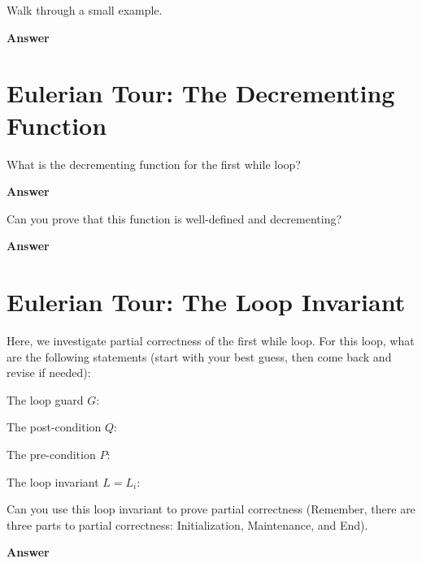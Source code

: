 \documentclass{article}
\begin{document}
\pagebreak

Walk through a small example.

\textbf{Answer}

\pagebreak
\section*{Eulerian Tour: The Decrementing Function}

What is the decrementing function for the first while loop?

\textbf{Answer}
\vspace{1in}


Can you prove that this function is well-defined and decrementing?

\textbf{Answer}
\vspace{1in}


\pagebreak
\section*{Eulerian Tour: The Loop Invariant}

Here, we investigate partial correctness of the first while loop.  For this loop, what
are the following statements (start with your best guess, then come back and
revise if needed):

The loop guard $G$:
\vspace{0.5in}

The post-condition $Q$:
\vspace{0.5in}

The pre-condition $P$:
\vspace{0.5in}

The loop invariant $L=L_i$:
\vspace{0.5in}


Can you use this loop invariant
to prove partial correctness (Remember, there are three parts to partial
correctness: Initialization, Maintenance, and End).

\textbf{Answer}
\vspace{1in}
\end{document}
